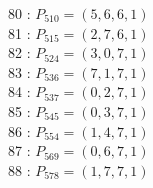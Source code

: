 \documentclass{article}
\begin{document}
{\begin{multicols}{3}
80 : $P_{510}=( 5, 6, 6, 1 )$\\
81 : $P_{515}=( 2, 7, 6, 1 )$\\
82 : $P_{524}=( 3, 0, 7, 1 )$\\
83 : $P_{536}=( 7, 1, 7, 1 )$\\
84 : $P_{537}=( 0, 2, 7, 1 )$\\
85 : $P_{545}=( 0, 3, 7, 1 )$\\
86 : $P_{554}=( 1, 4, 7, 1 )$\\
87 : $P_{569}=( 0, 6, 7, 1 )$\\
88 : $P_{578}=( 1, 7, 7, 1 )$\\
\end{multicols}


%


%


}%
\end{document}
